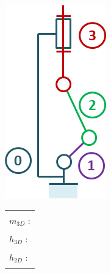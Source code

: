 \documentclass[10pt,fleqn]{article} %
\begin{document}
\begin{multicols}{2}
\begin{minipage}[c]{.45\linewidth}
\begin{center}
\includegraphics[width=.8\linewidth]{images/cas_02.png}
\end{center}
\end{minipage} \hfill
\begin{minipage}[c]{.5\linewidth}
\begin{center}
\begin{tabular}{|p{3cm}|}
\hline 
\\
$m_{3D}$ : \\
\\
$h_{3D}$ : \\
\\
$h_{2D}$ : \\
\\
\hline
\end{tabular}
\end{center}
\end{minipage}



\end{multicols}
\end{document}
